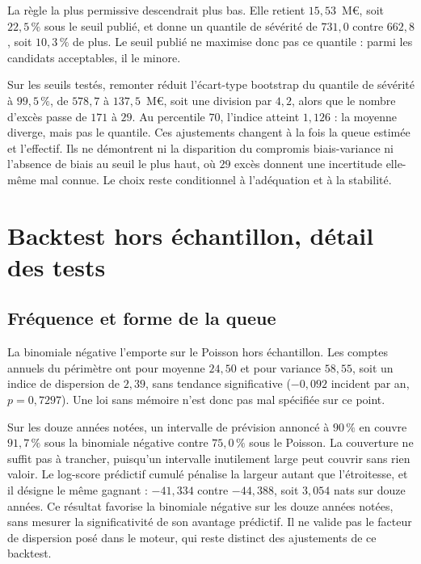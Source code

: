 La règle la plus permissive descendrait plus bas. Elle retient $15{,}53$~M\euro, soit $22{,}5\,\%$ sous le
seuil publié, et donne un quantile de sévérité de $731{,}0$ contre $662{,}8$, soit $10{,}3\,\%$ de plus. Le
seuil publié ne maximise donc pas ce quantile : parmi les candidats acceptables, il le minore.

Sur les seuils testés, remonter réduit l'écart-type bootstrap du quantile de sévérité à $99{,}5\,\%$,
de $578{,}7$ à $137{,}5$~M\euro, soit une division par $4{,}2$, alors que le nombre d'excès passe
de $171$ à $29$. Au percentile $70$, l'indice atteint $1{,}126$ : la moyenne diverge, mais pas le quantile.
Ces ajustements changent à la fois la queue estimée et l'effectif. Ils ne démontrent ni la disparition
du compromis biais-variance ni l'absence de biais au seuil le plus haut, où $29$ excès donnent une
incertitude elle-même mal connue. Le choix reste conditionnel à l'adéquation et à la stabilité.

\section{Backtest hors échantillon, détail des tests}
\label{sec:ann-backtest}

\subsection{Fréquence et forme de la queue}

La binomiale négative l'emporte sur le Poisson hors échantillon. Les comptes annuels du périmètre ont
pour moyenne $24{,}50$ et pour variance $58{,}55$, soit un indice de dispersion de $2{,}39$, sans tendance
significative ($-0{,}092$ incident par an, $p=0{,}7297$). Une loi sans mémoire n'est donc pas mal
spécifiée sur ce point.

Sur les douze années notées, un intervalle de prévision annoncé à $90\,\%$ en couvre
$91{,}7\,\%$ sous la binomiale négative contre $75{,}0\,\%$ sous le Poisson. La couverture ne suffit pas à
trancher, puisqu'un intervalle inutilement large peut couvrir sans rien valoir. Le log-score prédictif
cumulé pénalise la largeur autant que l'étroitesse, et il désigne le même gagnant : $-41{,}334$ contre
$-44{,}388$, soit $3{,}054$ nats sur douze années. Ce résultat favorise la binomiale négative sur les douze années notées, sans mesurer
la significativité de son avantage prédictif. Il ne valide pas le facteur de dispersion posé
dans le moteur, qui reste distinct des ajustements de ce backtest.

